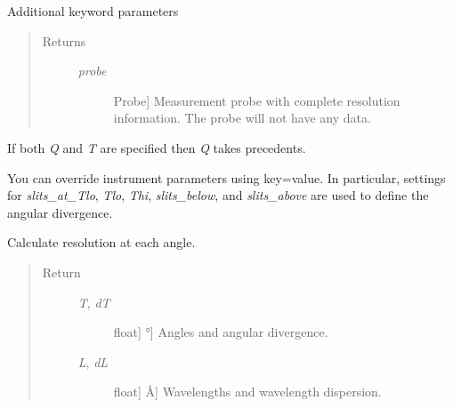 \documentclass[letterpaper,10pt,english]{sphinxmanual}
\begin{document}
\begin{fulllineitems}
\begin{fulllineitems}
Additional keyword parameters
\begin{quote}\begin{description}
\item[{Returns }] \leavevmode\begin{description}
\item[{\emph{probe}}] \leavevmode{[}Probe{]}
Measurement probe with complete resolution information.  The
probe will not have any data.

\end{description}

\end{description}\end{quote}

If both \emph{Q} and \emph{T} are specified then \emph{Q} takes precedents.

You can override instrument parameters using key=value.  In
particular, settings for \emph{slits\_at\_Tlo}, \emph{Tlo}, \emph{Thi},
\emph{slits\_below}, and \emph{slits\_above} are used to define the
angular divergence.

\end{fulllineitems}


\begin{fulllineitems}
\label{api/instrument:refl1d.instrument.Monochromatic.resolution}
Calculate resolution at each angle.
\begin{quote}\begin{description}
\item[{Return }] \leavevmode\begin{description}
\item[{\emph{T}, \emph{dT}}] \leavevmode{[}{[}float{]} \textbar{} °{]}
Angles and angular divergence.

\item[{\emph{L}, \emph{dL}}] \leavevmode{[}{[}float{]} \textbar{} Å{]}
Wavelengths and wavelength dispersion.

\end{description}

\end{description}\end{quote}

\end{fulllineitems}


\end{fulllineitems}
\end{document}
